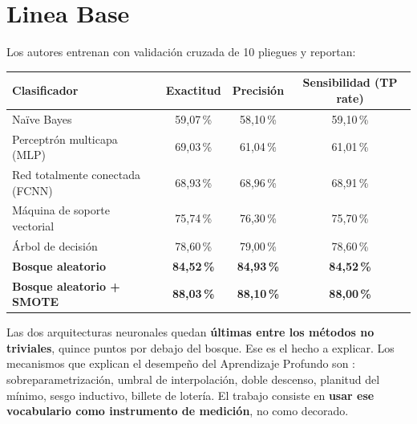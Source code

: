 \documentclass[11pt, a4paper]{article}
\begin{document}

\section{Linea Base}

Los autores entrenan con validaci\'on cruzada de 10 pliegues y reportan:

\vspace{0.5em}
\noindent
\begin{tabularx}{\textwidth}{@{}Xccc@{}}
\toprule
\textbf{Clasificador} & \textbf{Exactitud} & \textbf{Precisi\'on} & \textbf{Sensibilidad (TP rate)}\\
\midrule
Na\"ive Bayes                     & 59{,}07\,\% & 58{,}10\,\% & 59{,}10\,\%\\
Perceptr\'on multicapa (MLP)      & 69{,}03\,\% & 61{,}04\,\% & 61{,}01\,\%\\
Red totalmente conectada (FCNN)   & 68{,}93\,\% & 68{,}96\,\% & 68{,}91\,\%\\
M\'aquina de soporte vectorial    & 75{,}74\,\% & 76{,}30\,\% & 75{,}70\,\%\\
\'Arbol de decisi\'on             & 78{,}60\,\% & 79{,}00\,\% & 78{,}60\,\%\\
\textbf{Bosque aleatorio}         & \textbf{84{,}52\,\%} & \textbf{84{,}93\,\%} & \textbf{84{,}52\,\%}\\
\textbf{Bosque aleatorio + SMOTE} & \textbf{88{,}03\,\%} & \textbf{88{,}10\,\%} & \textbf{88{,}00\,\%}\\
\bottomrule
\end{tabularx}

\vspace{0.8em}
\noindent
Las dos arquitecturas neuronales quedan \textbf{\'ultimas entre los m\'etodos no triviales}, quince puntos por debajo del bosque. Ese es el hecho a explicar. Los mecanismos que explican el desempeño del Aprendizaje Profundo son : sobreparametrizaci\'on, umbral de interpolaci\'on, doble descenso, planitud del m\'inimo, sesgo inductivo, billete de loter\'ia. El trabajo consiste en \textbf{usar ese vocabulario como instrumento de medici\'on}, no como decorado.
\end{document}
